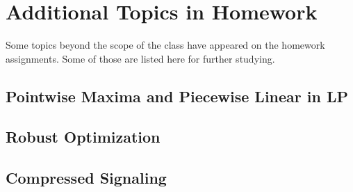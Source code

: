 \chapter{Additional Topics in Homework}
Some topics beyond the scope of the class have appeared on the homework assignments. Some of those are listed here for further studying.
\section{Pointwise Maxima and Piecewise Linear in LP}
\section{Robust Optimization}
\section{Compressed Signaling}